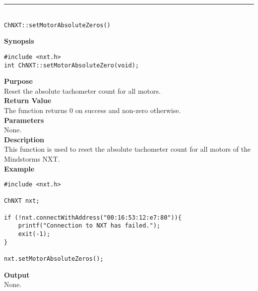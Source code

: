 \noindent
\vspace{5pt}
\rule{4.5in}{0.015in}\\
\noindent
{\LARGE \texttt{ChNXT::setMotorAbsoluteZeros()} }\\


\noindent
{\bf Synopsis}
\begin{lstlisting}
#include <nxt.h>
int ChNXT::setMotorAbsoluteZero(void);
\end{lstlisting}

\noindent
{\bf Purpose}\\
Reset the absolute tachometer count for all motors.\\

\noindent
{\bf Return Value}\\
The function returns 0 on success and non-zero otherwise.\\

\noindent
{\bf Parameters}\\
None.\\

\noindent
{\bf Description}\\
This function is used to reset the absolute tachometer count for 
all motors of the Mindstorms NXT.\\

\noindent
{\bf Example}
\begin{lstlisting}
#include <nxt.h> 

ChNXT nxt;

if (!nxt.connectWithAddress("00:16:53:12:e7:80")){
    printf("Connection to NXT has failed.");
    exit(-1);
}
    
nxt.setMotorAbsoluteZeros();
\end{lstlisting}

\noindent
{\bf Output}\\
None.\\
\\
